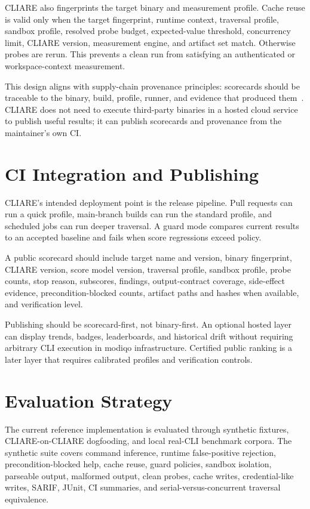 \documentclass[11pt]{article}
\begin{document}
CLIARE also fingerprints the target binary and measurement profile. Cache reuse is valid only when the target fingerprint, runtime context, traversal profile, sandbox profile, resolved probe budget, expected-value threshold, concurrency limit, CLIARE version, measurement engine, and artifact set match. Otherwise probes are rerun. This prevents a clean run from satisfying an authenticated or workspace-context measurement.

This design aligns with supply-chain provenance principles: scorecards should be traceable to the binary, build, profile, runner, and evidence that produced them~\cite{slsa-provenance}. CLIARE does not need to execute third-party binaries in a hosted cloud service to publish useful results; it can publish scorecards and provenance from the maintainer's own CI.

\section{CI Integration and Publishing}

CLIARE's intended deployment point is the release pipeline. Pull requests can run a quick profile, main-branch builds can run the standard profile, and scheduled jobs can run deeper traversal. A guard mode compares current results to an accepted baseline and fails when score regressions exceed policy.

A public scorecard should include target name and version, binary fingerprint, CLIARE version, score model version, traversal profile, sandbox profile, probe counts, stop reason, subscores, findings, output-contract coverage, side-effect evidence, precondition-blocked counts, artifact paths and hashes when available, and verification level.

Publishing should be scorecard-first, not binary-first. An optional hosted layer can display trends, badges, leaderboards, and historical drift without requiring arbitrary CLI execution in modiqo infrastructure. Certified public ranking is a later layer that requires calibrated profiles and verification controls.

\section{Evaluation Strategy}

The current reference implementation is evaluated through synthetic fixtures, CLIARE-on-CLIARE dogfooding, and local real-CLI benchmark corpora. The synthetic suite covers command inference, runtime false-positive rejection, precondition-blocked help, cache reuse, guard policies, sandbox isolation, parseable output, malformed output, clean probes, cache writes, credential-like writes, SARIF, JUnit, CI summaries, and serial-versus-concurrent traversal equivalence.
\end{document}
